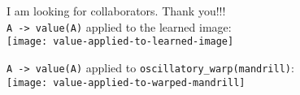 \documentclass{beamer}
\newcommand{\msmagenta}[1]{{\color{mymagenta} #1}}
\begin{document}
\begin{frame}

\msmagenta{I am looking for collaborators.}  Thank you!!!\\[2ex]

{\footnotesize\tt A -> value(A)} applied to the learned image:\\[2ex]

\texttt{[image: value-applied-to-learned-image]}

{\footnotesize\tt A -> value(A)} applied to \msmagenta{\footnotesize\tt oscillatory\_warp(mandrill)}:\\[2ex]

\texttt{[image: value-applied-to-warped-mandrill]}
\end{frame}
\end{document}
